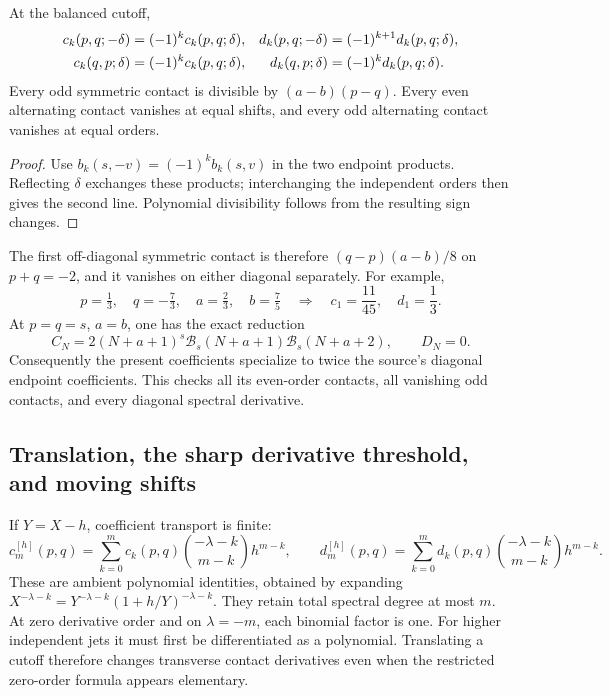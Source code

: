 \begin{proposition}\label{ct:parity}
At the balanced cutoff,
\begin{align}
 c_k(p,q;-\delta)&=(-1)^kc_k(p,q;\delta),&
 d_k(p,q;-\delta)&=(-1)^{k+1}d_k(p,q;\delta),\label{ct:reflection}\\
 c_k(q,p;\delta)&=(-1)^kc_k(p,q;\delta),&
 d_k(q,p;\delta)&=(-1)^kd_k(p,q;\delta).\notag
\end{align}
Every odd symmetric contact is divisible by $(a-b)(p-q)$.
Every even alternating contact vanishes at equal shifts, and every odd
alternating contact vanishes at equal orders.
\end{proposition}
\begin{proof}
Use $b_k(s,-v)=(-1)^kb_k(s,v)$ in the two endpoint products. Reflecting
$\delta$ exchanges these products; interchanging the independent orders
then gives the second line. Polynomial divisibility follows from the
resulting sign changes.
\end{proof}

The first off-diagonal symmetric contact is therefore
$(q-p)(a-b)/8$ on $p+q=-2$, and it vanishes on either diagonal separately.
For example,
\[
 p=\tfrac13,\quad q=-\tfrac73,\quad a=\tfrac23,\quad b=\tfrac75
 \quad\Longrightarrow\quad c_1=\frac{11}{45},\quad d_1=\frac13.
\]
At $p=q=s$, $a=b$, one has the exact reduction
\[
 C_N=2(N+a+1)^s\mathcal B_s(N+a+1)\mathcal B_s(N+a+2),
 \qquad D_N=0.
\]
Consequently the present coefficients specialize to twice the source's
diagonal endpoint coefficients. This checks all its even-order contacts,
all vanishing odd contacts, and every diagonal spectral derivative.

\subsection{Translation, the sharp derivative threshold, and moving shifts}

If $Y=X-h$, coefficient transport is finite:
\begin{equation}\label{ct:translate}
 c_m^{[h]}(p,q)=\sum_{k=0}^m c_k(p,q)
      \binom{-\lambda-k}{m-k}h^{m-k},
 \qquad
 d_m^{[h]}(p,q)=\sum_{k=0}^m d_k(p,q)
      \binom{-\lambda-k}{m-k}h^{m-k}.
\end{equation}
These are ambient polynomial identities, obtained by expanding
$X^{-\lambda-k}=Y^{-\lambda-k}(1+h/Y)^{-\lambda-k}$.
They retain total spectral degree at most $m$. At zero derivative order
and on $\lambda=-m$, each binomial factor is one. For higher independent
jets it must first be differentiated as a polynomial. Translating a cutoff
therefore changes transverse contact derivatives even when the restricted
zero-order formula appears elementary.

